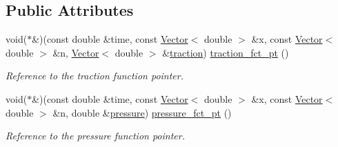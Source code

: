 \subsection*{Public Attributes}
\begin{DoxyCompactItemize}
\item 
void($\ast$\&)(const double \&time, const \hyperlink{classoomph_1_1Vector}{Vector}$<$ double $>$ \&x, const \hyperlink{classoomph_1_1Vector}{Vector}$<$ double $>$ \&n, \hyperlink{classoomph_1_1Vector}{Vector}$<$ double $>$ \&\hyperlink{classoomph_1_1AxisymmetricPoroelasticityTractionElement_abb8e937540df8384b6129793497f1e50}{traction}) \hyperlink{classoomph_1_1AxisymmetricPoroelasticityTractionElement_aa33c50e13b91213e8f5b5babf507718e}{traction\+\_\+fct\+\_\+pt} ()
\begin{DoxyCompactList}\small\item\em Reference to the traction function pointer. \end{DoxyCompactList}\item 
void($\ast$\&)(const double \&time, const \hyperlink{classoomph_1_1Vector}{Vector}$<$ double $>$ \&x, const \hyperlink{classoomph_1_1Vector}{Vector}$<$ double $>$ \&n, double \&\hyperlink{classoomph_1_1AxisymmetricPoroelasticityTractionElement_a9d0a69336be18e1a62450c5c8872777b}{pressure}) \hyperlink{classoomph_1_1AxisymmetricPoroelasticityTractionElement_a160a754eb4572b56b146126729e89317}{pressure\+\_\+fct\+\_\+pt} ()
\begin{DoxyCompactList}\small\item\em Reference to the pressure function pointer. \end{DoxyCompactList}\end{DoxyCompactItemize}
